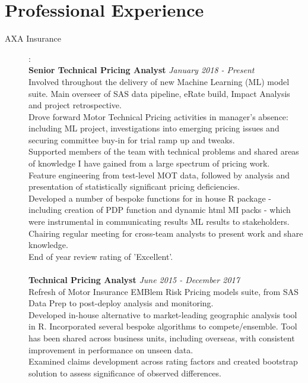 \documentclass[11pt]{article}
\begin{document}
\section*{Professional Experience}
\begin{description}

\item[AXA Insurance]: \\
\textbf{Senior Technical Pricing Analyst} \emph{January 2018 - Present}\\
\textbullet \quad Involved throughout the delivery of new Machine Learning (ML) model suite. Main overseer of SAS data pipeline, eRate build, Impact Analysis and project retrospective. \\
\textbullet \quad Drove forward Motor Technical Pricing activities in manager's absence: including ML project, investigations into emerging pricing issues and securing committee buy-in for trial ramp up and tweaks. \\
\textbullet \quad Supported members of the team with technical problems and shared areas of knowledge I have gained from a large spectrum of pricing work. \\
\textbullet \quad Feature engineering from test-level MOT data, followed by analysis and presentation of statistically significant pricing deficiencies. \\
\textbullet \quad Developed a number of bespoke functions for in house R package - including creation of PDP function and dynamic html MI packs - which were instrumental in communicating results ML results to stakeholders. \\
\textbullet \quad Chairing regular meeting for cross-team analysts to present work and share knowledge. \\
\textbullet \quad End of year review rating of 'Excellent'.
\\\\
\textbf{Technical Pricing Analyst} \emph{June 2015 - December 2017}\\
\textbullet \quad Refresh of Motor Insurance EMBlem Risk Pricing models suite, from SAS Data Prep to post-deploy analysis and monitoring. \\
\textbullet \quad Developed in-house alternative to market-leading geographic analysis tool in R. Incorporated several bespoke algorithms to compete/ensemble. Tool has been shared across business units, including overseas, with consistent improvement in performance on unseen data. \\
\textbullet \quad Examined claims development across rating factors and created bootstrap solution to assess significance of observed differences. \\

\end{description}
\end{document}

